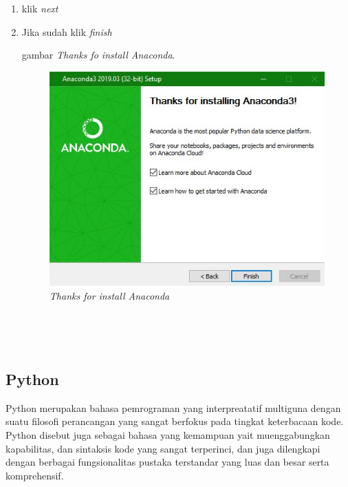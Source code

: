 \begin{enumerate}
\item klik \textit{next}
\item Jika sudah klik \textit{finish}

 gambar \textit{Thanks fo install Anaconda}.

\begin{figure}[!htbp]
    \centering
    \includegraphics[scale=0.5]{figures/qz.jpg}
    \caption{\textit{Thanks for install Anaconda}}
    \label{Figureanaconda70}
\end{figure}
\\
\end{enumerate}
\\
\subsection{Python}
\par
    Python merupakan bahasa pemrograman yang interpreatatif multiguna dengan suatu filosofi perancangan yang sangat berfokus pada tingkat keterbacaan kode. Python disebut juga sebagai bahasa yang kemampuan yait muenggabungkan kapabilitas, dan sintaksis kode yang sangat terperinci, dan juga dilengkapi dengan berbagai fungsionalitas pustaka terstandar yang luas dan besar serta komprehensif.
